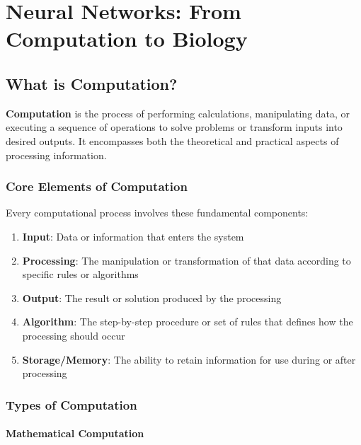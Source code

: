 \section{Neural Networks: From Computation to Biology}
\label{sec:nn-computation-biology}

\subsection{What is Computation?}
\label{subsec:what-is-computation}

\textbf{Computation} is the process of performing calculations, manipulating data, or executing a sequence of operations to solve problems or transform inputs into desired outputs. It encompasses both the theoretical and practical aspects of processing information.

\subsubsection{Core Elements of Computation}
\label{subsubsec:core-elements-computation}

Every computational process involves these fundamental components:

\begin{enumerate}
\item \textbf{Input}: Data or information that enters the system
\item \textbf{Processing}: The manipulation or transformation of that data according to specific rules or algorithms
\item \textbf{Output}: The result or solution produced by the processing
\item \textbf{Algorithm}: The step-by-step procedure or set of rules that defines how the processing should occur
\item \textbf{Storage/Memory}: The ability to retain information for use during or after processing
\end{enumerate}

\subsubsection{Types of Computation}
\label{subsubsec:types-computation}

\paragraph{Mathematical Computation}
\label{para:mathematical-computation}

